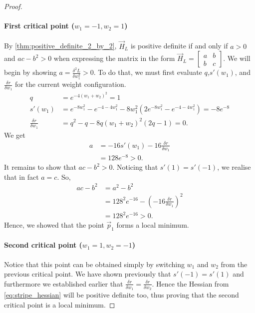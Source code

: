 \begin{proof}
    \paragraph{First critical point ($w_1=-1, w_2=1$)}
    By \ref{thm:positive_definite_2_by_2}, $\vec{H}_L$ is positive definite if and only if $a>0$ and $ac-b^2>0$ when expressing the matrix in the form
    $\vec{H}_L = \begin{bmatrix}
        a & b \\ b & c
    \end{bmatrix}$.
    We will begin by showing $a = \frac{\delta ^2 L}{\delta w_1^2}>0$.
    To do that, we must first evaluate $q$,$s'(w_1)$, and $\frac{\delta r}{\delta w_1}$ for the current weight configuration.
    \begin{align*}
        q &= e^{-4(w_1+w_2)^2} = 1 \\
        s'(w_1) &= e^{-8 w_1^2} - e^{-4 -4w_1^2} - 8 w_1^2 \left(2 e^{-8 w_1^2} - e^{-4-4 w_1^2}\right) = -8e^{-8} \\
        \frac{\delta r}{\delta w_1} &= q^2 - q - 8q(w_1 + w_2)^2 (2q - 1) = 0.
    \end{align*}
    We get
    \begin{align*}
        a &= -16s'(w_1) - 16 \frac{\delta r}{\delta w_1} \\
        &= 128 e^{-8} > 0.
    \end{align*}
    It remains to show that $ac - b^2 > 0$. 
    Noticing that $s'(1) = s'(-1)$, we realise that in fact $a=c$.
    So,
    \begin{align*}
        ac - b^2
        &= a^2 - b^2 \\
        &= 128^2e^{-16} - \left(-16 \frac{\delta r}{\delta w_1}\right)^2 \\
        &= 128^2e^{-16} > 0.
    \end{align*}
    Hence, we showed that the point $\vec{p}_1$ forms a local minimum.

    \paragraph{Second critical point ($w_1=1, w_2=-1$)}
    Notice that this point can be obtained simply by switching $w_1$ and $w_2$ from the previous critical point.
    We have shown previously that $s'(-1)=s'(1)$ and furthermore we established earlier that $\frac{\delta r}{\delta w_1} =\frac{\delta r}{\delta w_2}$.
    Hence the Hessian from \ref{eq:stripe_hessian} will be positive definite too, thus proving that the second critical point is a local minimum.


\end{proof}
